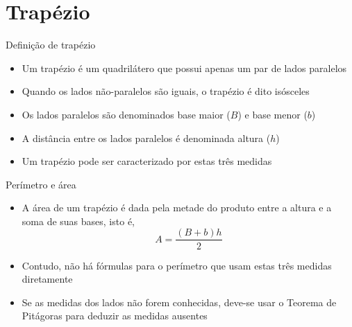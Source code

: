 \section{Trapézio}

\begin{frame}[fragile]{Definição de trapézio}

    \begin{itemize}
        \item Um trapézio é um quadrilátero que possui apenas um par de lados paralelos
        \pause

        \item Quando os lados não-paralelos são iguais, o trapézio é dito isósceles
        \pause

        \item Os lados paralelos são denominados base maior ($B$) e base menor ($b$)
        \pause

        \item A distância entre os lados paralelos é denominada altura ($h$)
        \pause

        \item Um trapézio pode ser caracterizado por estas três medidas
        \pause

    \end{itemize}

    \begin{figure}
        \centering

    \end{figure}

\end{frame}

\begin{frame}[fragile]{Perímetro e área}

    \begin{itemize}
        \item A área de um trapézio é dada pela metade do produto entre a altura e a soma de
            suas bases, isto é,
        \[
            A = \frac{(B + b)h}{2}
        \]
        \pause

        \item Contudo, não há fórmulas para o perímetro que usam estas três medidas diretamente
        \pause

        \item Se as medidas dos lados não forem conhecidas, deve-se usar o Teorema de
            Pitágoras para deduzir as medidas ausentes
        \pause
    \end{itemize}

\end{frame}
